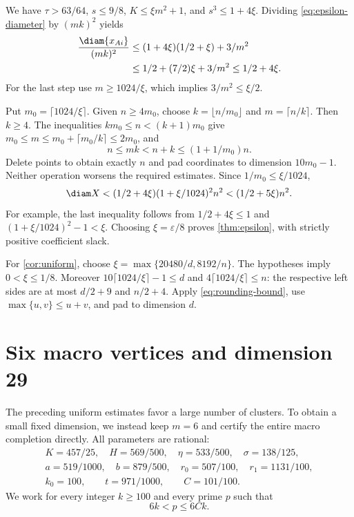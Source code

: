 We have $\tau>63/64$, $s\le9/8$, $K\le\xi m^2+1$, and
$s^3\le1+4\xi$. Dividing \eqref{eq:epsilon-diameter} by $(mk)^2$ yields
\begin{align*}
 \frac{\diam\{x_{Ai}\}}{(mk)^2}
 &\le(1+4\xi)(1/2+\xi)+3/m^2\\
 &\le1/2+(7/2)\xi+3/m^2\le1/2+4\xi.
\end{align*}
For the last step use $m\ge1024/\xi$, which implies $3/m^2\le\xi/2$.

Put $m_0=\lceil1024/\xi\rceil$. Given $n\ge4m_0$, choose
$k=\lfloor n/m_0\rfloor$ and $m=\lceil n/k\rceil$. Then
$k\ge4$. The inequalities $km_0\le n<(k+1)m_0$ give
$m_0\le m\le m_0+\lceil m_0/k\rceil\le2m_0$, and
\[
 n\le mk<n+k\le(1+1/m_0)n.
\]
Delete points to obtain exactly $n$ and pad coordinates to dimension
$10m_0-1$. Neither operation worsens the required estimates. Since
$1/m_0\le\xi/1024$,
\begin{equation}\label{eq:rounding-bound}
 \diam X<(1/2+4\xi)(1+\xi/1024)^2n^2<(1/2+5\xi)n^2.
\end{equation}
For example, the last inequality follows from $1/2+4\xi\le1$ and
$(1+\xi/1024)^2-1<\xi$. Choosing $\xi=\varepsilon/8$ proves
\cref{thm:epsilon}, with strictly positive coefficient slack.

For \cref{cor:uniform}, choose
$\xi=\max\{20480/d,8192/n\}$. The hypotheses imply $0<\xi\le1/8$.
Moreover $10\lceil1024/\xi\rceil-1\le d$ and
$4\lceil1024/\xi\rceil\le n$: the respective left sides are at most
$d/2+9$ and $n/2+4$. Apply \eqref{eq:rounding-bound}, use
$\max\{u,v\}\le u+v$, and pad to dimension $d$.

\section{Six macro vertices and dimension 29}\label{sec:r29-proof}

The preceding uniform estimates favor a large number of clusters. To
obtain a small fixed dimension, we instead keep $m=6$ and certify the
entire macro completion directly. All parameters are rational:
\begin{equation}\label{eq:r29-parameters}
\begin{gathered}
 K=457/25,\quad H=569/500,\quad\eta=533/500,\quad\sigma=138/125,\\
 a=519/1000,\quad b=879/500,\quad r_0=507/100,\quad r_1=1131/100,\\
 k_0=100,\qquad t=971/1000,\qquad C=101/100.
\end{gathered}
\end{equation}
We work for every integer $k\ge100$ and every prime $p$ such that
\begin{equation}\label{eq:admissible-prime}
 6k<p\le6Ck.
\end{equation}

